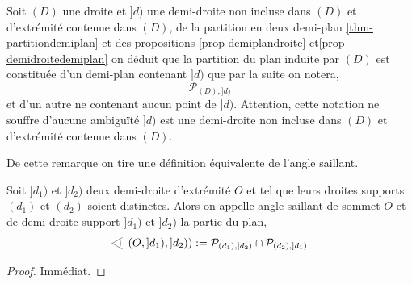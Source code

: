 \begin{rema}
    Soit $(D)$ une droite et $]d)$ une demi-droite non incluse dans $(D)$ et d'extrémité contenue dans $(D)$, de la partition en deux demi-plan \ref{thm-partitiondemiplan} et des propositions \ref{prop-demiplandroite} et\ref{prop-demidroitedemiplan} on déduit que la partition du plan induite par $(D)$ est constituée d'un demi-plan contenant $]d)$ que par la suite on notera,
    \begin{equation*}
        \mathcal{P}_{(D),]d)}    
    \end{equation*}
    et d'un autre ne contenant aucun point de $]d)$.  Attention, cette notation ne souffre d'aucune ambiguïté \ssi $]d)$ est une demi-droite non incluse dans $(D)$ et d'extrémité contenue dans $(D)$.

    De cette remarque on tire une définition équivalente de l'angle saillant. 
\end{rema}
\begin{prop}\label{prop-anglesaillantequiv}
    Soit $]d_1)$ et $]d_2)$ deux demi-droite d'extrémité $O$ et tel que leurs droites supports $(d_1)$ et $(d_2)$ soient distinctes. Alors on appelle angle saillant de sommet $O$ et de demi-droite support $]d_1)$ et $]d_2)$ la partie du plan,
    \begin{equation*}
        \anglesaillant\left(O,]d_1),]d_2)\right) := \mathcal{P}_{(d_1),]d_2)}\cap \mathcal{P}_{(d_2),]d_1)}
    \end{equation*}
\begin{proof}
    Immédiat.
\end{proof}
\end{prop}

